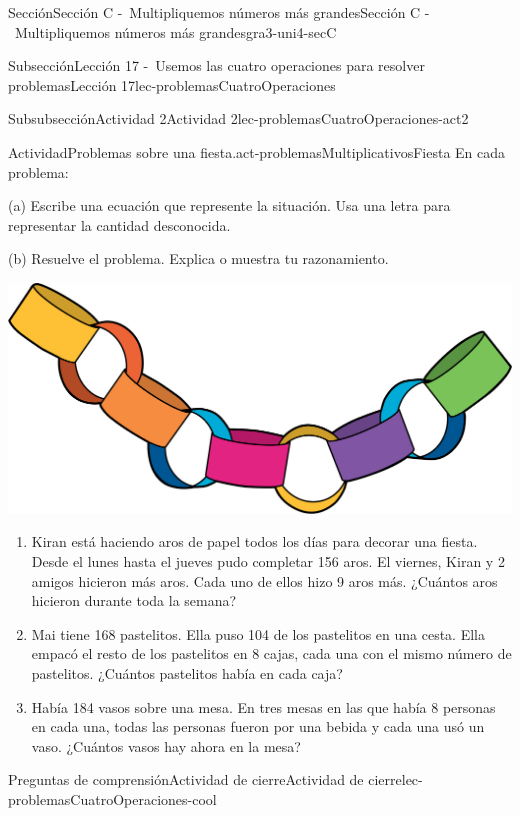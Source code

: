 \documentclass[twoside,10pt,]{article}
\begin{document}
\begin{sectionptx}{Sección}{Sección C -~Multipliquemos números más grandes}{}{Sección C -~Multipliquemos números más grandes}{}{}{gra3-uni4-secC}
\begin{subsectionptx}{Subsección}{Lección 17 -~Usemos las cuatro operaciones para resolver problemas}{}{Lección 17}{}{}{lec-problemasCuatroOperaciones}
\begin{subsubsectionptx}{Subsubsección}{Actividad 2}{}{Actividad 2}{}{}{lec-problemasCuatroOperaciones-act2}
\begin{activity}{Actividad}{Problemas sobre una fiesta.}{act-problemasMultiplicativosFiesta}
En cada problema:%
\begin{sidebyside}{2}{0.02}{0}{0.08}%
\begin{sbspanel}{0.6}%
(a) Escribe una ecuación que represente la situación. Usa una letra para representar la cantidad desconocida.%
\par
(b) Resuelve el problema. Explica o muestra tu razonamiento.%
\end{sbspanel}%
\begin{sbspanel}{0.3}%
\includegraphics[width=\linewidth]{external/png-source/CS 3.4 Lesson 17.png}
\end{sbspanel}%
\end{sidebyside}%
%
\begin{enumerate}
\item{}Kiran está haciendo aros de papel todos los días para decorar una fiesta. Desde el lunes hasta el jueves pudo completar 156 aros. El viernes, Kiran y 2 amigos hicieron más aros. Cada uno de ellos hizo 9 aros más. ¿Cuántos aros hicieron durante toda la semana?%
\item{}Mai tiene 168 pastelitos. Ella puso 104 de los pastelitos en una cesta. Ella empacó el resto de los pastelitos en 8 cajas, cada una con el mismo número de pastelitos. ¿Cuántos pastelitos había en cada caja?%
\item{}Había 184 vasos sobre una mesa. En tres mesas en las que había 8 personas en cada una, todas las personas fueron por una bebida y cada una usó un vaso. ¿Cuántos vasos hay ahora en la mesa?%
\end{enumerate}
\end{activity}%
\end{subsubsectionptx}
%
%
\typeout{************************************************}
\typeout{************************************************}
%
\begin{reading-questions-subsubsection}{Preguntas de comprensión}{Actividad de cierre}{}{Actividad de cierre}{}{}{lec-problemasCuatroOperaciones-cool}

\end{reading-questions-subsubsection}
\end{subsectionptx}
\end{sectionptx}
\end{document}
